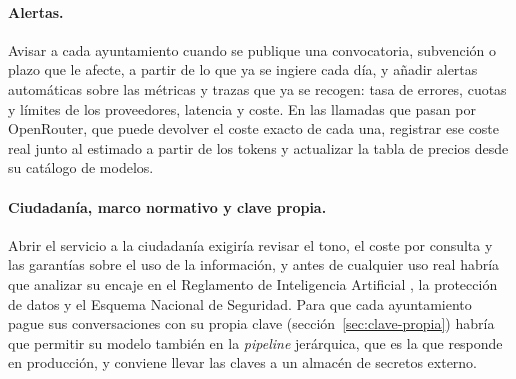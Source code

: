 \paragraph{Alertas.} Avisar a cada ayuntamiento cuando se publique una convocatoria, subvención o plazo que le afecte, a partir de lo que ya se ingiere cada día, y añadir alertas automáticas sobre las métricas y trazas que ya se recogen: tasa de errores, cuotas y límites de los proveedores, latencia y coste. En las llamadas que pasan por OpenRouter, que puede devolver el coste exacto de cada una, registrar ese coste real junto al estimado a partir de los tokens y actualizar la tabla de precios desde su catálogo de modelos.

\paragraph{Ciudadanía, marco normativo y clave propia.} Abrir el servicio a la ciudadanía exigiría revisar el tono, el coste por consulta y las garantías sobre el uso de la información, y antes de cualquier uso real habría que analizar su encaje en el Reglamento de Inteligencia Artificial \cite{aiact}, la protección de datos y el Esquema Nacional de Seguridad. Para que cada ayuntamiento pague sus conversaciones con su propia clave (sección~\ref{sec:clave-propia}) habría que permitir su modelo también en la \emph{pipeline} jerárquica, que es la que responde en producción, y conviene llevar las claves a un almacén de secretos externo.
